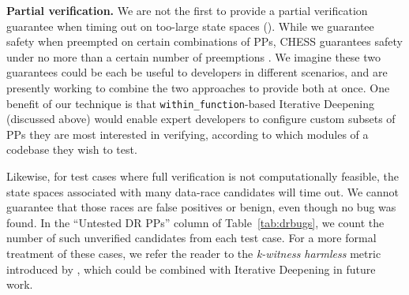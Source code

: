 
{\bf Partial verification.}
We are not the first to provide a partial verification guarantee when timing out on too-large state spaces (\sect{\ref{sec:eval-sssmc}}).
While we guarantee safety when preempted on certain combinations of PPs,
CHESS
guarantees safety under no more than a certain number of preemptions \cite{chess-icb}.
We imagine these two guarantees could be each be useful to developers in different scenarios,
and are presently working to combine the two approaches to provide both at once.
One benefit of our technique is that {\tt within\_function}-based Iterative Deepening (discussed above)
would enable expert developers to configure custom subsets of PPs they are most interested in verifying,
according to which modules of a codebase they wish to test.

Likewise, for test cases where full verification is not computationally feasible,
the state spaces associated with many data-race candidates will time out.
We cannot guarantee that those races are false positives or benign, even though no bug was found.
In the ``Untested DR PPs'' column of Table~\ref{tab:drbugs}, we count the number of such unverified candidates from each test case.
For a more formal treatment of these cases, we refer the reader to the {\em k-witness harmless} metric introduced by \cite{portend},
which could be combined with Iterative Deepening in future work.
